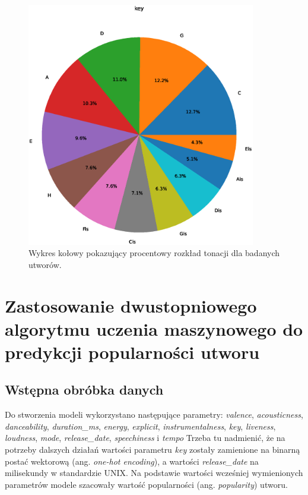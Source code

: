 \documentclass[a4paper,11pt]{article}
\begin{document}
    \begin{figure}[H]
        \label{fig:key}
        \centering
        \includegraphics[width=10cm,keepaspectratio]{key}
        \caption{Wykres kołowy pokazujący procentowy rozkład tonacji dla badanych utworów.}
    \end{figure}


    \section{Zastosowanie dwustopniowego algorytmu uczenia maszynowego do predykcji popularności utworu}

    \subsection{Wstępna obróbka danych}

    Do stworzenia modeli wykorzystano następujące parametry: \textit{valence}, \textit{acousticness}, \textit{danceability}, \textit{duration\_ms}, \textit{energy}, \textit{explicit}, \textit{instrumentalness}, \textit{key}, \textit{liveness}, \textit{loudness}, \textit{mode}, \textit{release\_date}, \textit{speechiness} i \textit{tempo} Trzeba tu nadmienić, że na potrzeby dalszych działań wartości parametru \textit{key} zostały zamienione na binarną postać wektorową (ang. \textit{one-hot encoding}), a wartości \textit{release\_date} na milisekundy w standardzie UNIX. Na podstawie wartości wcześniej wymienionych parametrów modele szacowały wartość popularności (ang. \textit{popularity}) utworu.
\end{document}
